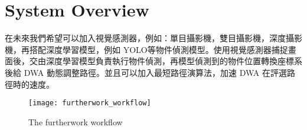 \documentclass[crop=false]{standalone}
\begin{document}
	\section{System Overview}
	
	在未來我們希望可以加入視覺感測器，例如：單目攝影機，雙目攝影機，深度攝影機，再搭配深度學習模型，例如 YOLO等物件偵測模型。使用視覺感測器捕捉畫面後，交由深度學習模型負責執行物件偵測，再模型偵測到的物件位置轉換座標系後給 DWA 動態調整路徑。並且可以加入最短路徑演算法，加速 DWA 在評選路徑時的速度。
	
	\begin{figure*}[thbp!]
		\centering
		\texttt{[image: furtherwork\_workflow]}
		\caption{The furtherwork workflow}
		\label{fig:furtherwork}
	\end{figure*}
\end{document}
